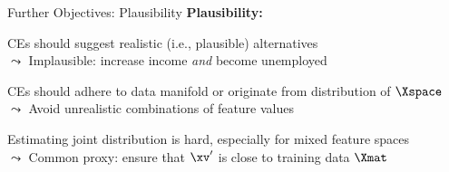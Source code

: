 \documentclass[10pt,compress,t,notes=noshow, xcolor=table]{beamer}
\begin{document}
\begin{framev}[align=top]{Further Objectives: Plausibility}
\textbf{Plausibility:}
\begin{itemizeM}
\item<1-> CEs should suggest realistic (i.e., plausible) alternatives\\
$\leadsto$ Implausible: increase income \emph{and} become unemployed
\item<2-> CEs should adhere to data manifold or originate from distribution of $\Xspace$\\
$\leadsto$ Avoid unrealistic combinations of feature values
\item<3-> Estimating joint distribution is hard, especially for mixed feature spaces\\
$\leadsto$ Common proxy: ensure that $\xv'$ is close to training data $\Xmat$
\end{itemizeM}
\end{framev}
\end{document}
